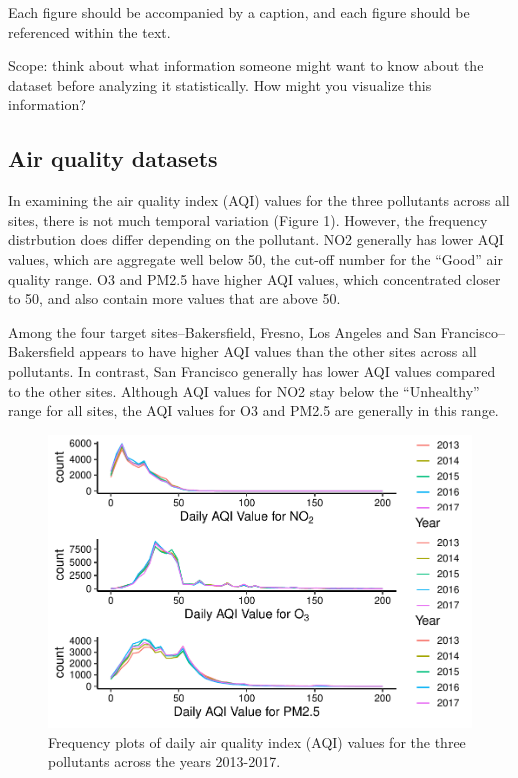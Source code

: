 \documentclass[12pt,]{article}
\begin{document}
Each figure should be accompanied by a caption, and each figure should
be referenced within the text.

Scope: think about what information someone might want to know about the
dataset before analyzing it statistically. How might you visualize this
information?

\hypertarget{air-quality-datasets}{%
\subsection{Air quality datasets}\label{air-quality-datasets}}

In examining the air quality index (AQI) values for the three pollutants
across all sites, there is not much temporal variation (Figure 1).
However, the frequency distrbution does differ depending on the
pollutant. NO2 generally has lower AQI values, which are aggregate well
below 50, the cut-off number for the ``Good'' air quality range. O3 and
PM2.5 have higher AQI values, which concentrated closer to 50, and also
contain more values that are above 50.

Among the four target sites--Bakersfield, Fresno, Los Angeles and San
Francisco--Bakersfield appears to have higher AQI values than the other
sites across all pollutants. In contrast, San Francisco generally has
lower AQI values compared to the other sites. Although AQI values for
NO2 stay below the ``Unhealthy'' range for all sites, the AQI values for
O3 and PM2.5 are generally in this range.

\begin{figure}
\centering
\includegraphics{Project_Template_files/figure-latex/unnamed-chunk-1-1.pdf}
\caption{Frequency plots of daily air quality index (AQI) values for the
three pollutants across the years 2013-2017.}
\end{figure}
\end{document}
